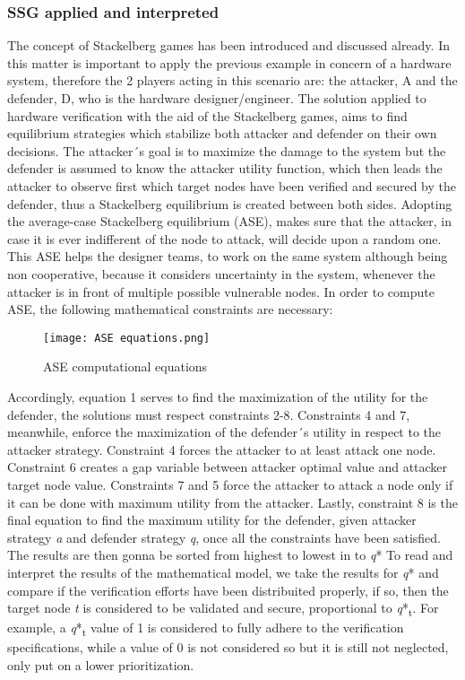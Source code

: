 \documentclass[conference]{IEEEtran}
\begin{document}
\subsubsection{SSG applied and interpreted}
The concept of Stackelberg games has been introduced and discussed already. In this matter is important to apply the previous example in concern of a hardware system, therefore the 2 players acting in this scenario are: the attacker, A and the defender, D, who is the hardware designer/engineer.
The solution applied to hardware verification with the aid of the Stackelberg games, aims to find equilibrium strategies which stabilize both attacker and defender on their own decisions. The attacker´s goal is to maximize the damage to the system but the defender is assumed to know the attacker utility function, which then leads the attacker to observe first which target nodes have been verified and secured by the defender, thus a Stackelberg equilibrium is created between both sides. Adopting the average-case Stackelberg equilibrium (ASE), makes sure that the attacker, in case it is ever indifferent of the node to attack, will decide upon a random one. This ASE helps the designer teams, to work on the same system although being non cooperative, because it considers uncertainty in the system, whenever the attacker is in front of multiple possible vulnerable nodes.
In order to compute ASE, the following mathematical constraints are necessary:
\begin{figure}[h]
    \centerline{\texttt{[image: ASE equations.png]}}
    \caption{ASE computational equations}
    \label{ase}
\end{figure} 

Accordingly, equation 1 serves to find the maximization of the utility for the defender, the solutions must respect constraints 2-8. 
Constraints 4 and 7, meanwhile, enforce the maximization of the defender´s utility in respect to the attacker strategy. Constraint 4 forces the attacker to at least attack one node. Constraint 6 creates a gap variable between attacker optimal value and attacker target node value. Constraints 7 and 5 force the attacker to attack a node only if it can be done with maximum utility from the attacker. Lastly, constraint 8 is the final equation to find the maximum utility for the defender, given attacker strategy \textit{a} and defender strategy \textit{q}, once all the constraints have been satisfied. The results are then gonna be sorted from highest to lowest in to \textit{q}*
To read and interpret the results of the mathematical model, we take the results for \textit{q}* and compare if the verification efforts have been distribuited properly, if so, then the target node \textit{t} is considered to be validated and secure, proportional to \textit{q}*\textsubscript{t}. For example, a \textit{q}*\textsubscript{t} value of 1 is considered to fully adhere to the verification specifications, while a value of 0 is not considered so but it is still not neglected, only put on a lower prioritization.
\end{document}
